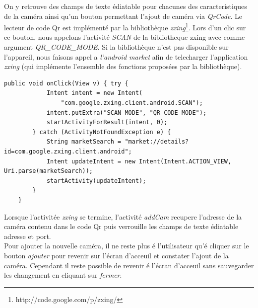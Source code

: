 On y retrouve des champs de texte édiatable pour chacunes
des caracteristiques de la caméra ainsi qu'un bouton permettant l'ajout de caméra via
\textit{QrCode}.
\indent Le lecteur de code Qr est implémenté par la bibliothèque
\textit{zxing}\footnote{\label{zxing} http://code.google.com/p/zxing/}. \newline
Lors d'un clic sur ce bouton, nous appelons l'activité 
\textit{SCAN} de la bibliotheque zxing avec comme argument
\textit{QR\_CODE\_MODE}.\newline
Si la bibliothèque n'est pas disponible sur l'appareil, nous faisons appel a
\textit{l'android market} afin de telecharger l'application \textit{zxing} (qui
implémente l'ensemble des fonctions proposées par la bibliothèque).
\newpage
\begin{lstlisting}[caption={Lancement de l'activité zxing ou de l'android
market.}] 
    public void onClick(View v) { try {
            Intent intent = new Intent(
                "com.google.zxing.client.android.SCAN");
            intent.putExtra("SCAN_MODE", "QR_CODE_MODE");
            startActivityForResult(intent, 0);
        } catch (ActivityNotFoundException e) {
            String marketSearch = "market://details?id=com.google.zxing.client.android";
            Intent updateIntent = new Intent(Intent.ACTION_VIEW, Uri.parse(marketSearch));
            startActivity(updateIntent);
        }
    }
\end{lstlisting}

\indent \newline
\indent Lorsque l'activitée \textit{zxing} se termine, l'activité
\textit{addCam} recupere l'adresse de la caméra contenu dans le code Qr puis verrouille les
champs de texte édiatable adresse et port.\\
\indent Pour ajouter la nouvelle
caméra, il ne reste plus  é l'utilisateur qu'é cliquer sur le bouton
\textit{ajouter} pour revenir sur l'écran d'acceuil et constater l'ajout de la caméra. Cependant il reste possible de revenir é l'écran d'acceuil sans sauvegarder les changement en cliquant sur \textit{fermer}.

